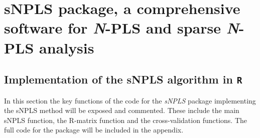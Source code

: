 
\chapter[sNPLS package, a comprehensive software for N-PLS and sparse N-PLS analysis]{sNPLS package, a comprehensive software for \textit{N}-PLS and sparse \textit{N}-PLS analysis}
\label{chapter:package}


\section{Implementation of the sNPLS algorithm in \texttt{R}}
In this section the key functions of the code for the \textit{sNPLS} package implementing the sNPLS method will be exposed and commented. These include the main sNPLS function, the R-matrix function and the cross-validation functions. The full code for the package will be included in the appendix.

